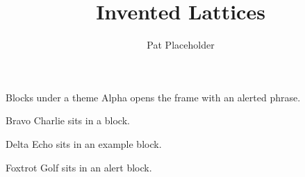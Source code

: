 \documentclass{ltframe}
\title{Invented Lattices}
\author{Pat Placeholder}
\begin{document}
\begin{frame}{Blocks under a theme}
Alpha opens the frame with \alert{an alerted phrase}.
\begin{block}{Bravo}
Charlie sits in a block.
\end{block}
\begin{exampleblock}{Delta}
Echo sits in an example block.
\end{exampleblock}
\begin{alertblock}{Foxtrot}
Golf sits in an alert block.
\end{alertblock}
\end{frame}
\end{document}
